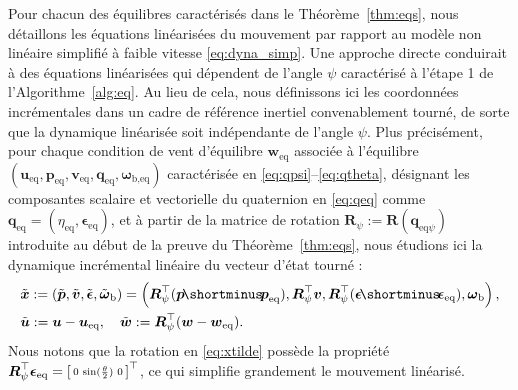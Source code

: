 Pour chacun des équilibres caractérisés dans le Théorème~\ref{thm:eqs}, nous détaillons les équations linéarisées du mouvement par rapport au modèle non linéaire simplifié à faible vitesse \eqref{eq:dyna_simp}. Une approche directe conduirait à des équations linéarisées qui dépendent de l'angle $\psi$ caractérisé à l'étape 1 de l'Algorithme~\ref{alg:eq}. Au lieu de cela, nous définissons ici les coordonnées incrémentales dans un cadre de référence inertiel convenablement tourné, de sorte que la dynamique linéarisée soit indépendante de l'angle $\psi$.
Plus précisément, pour chaque condition de vent d'équilibre $\boldsymbol{w}_{\text{eq}}$ associée à l'équilibre $(\boldsymbol{u}_{\text{eq}}, \boldsymbol{p}_{\text{eq}},\boldsymbol{v}_{\text{eq}}, \boldsymbol{q}_{\text{eq}},\boldsymbol{\omega}_{\text{b},\text{eq}})$  caractérisée en \eqref{eq:qpsi}--\eqref{eq:qtheta}, 
désignant les composantes scalaire et vectorielle du quaternion en \eqref{eq:qeq} comme
$\boldsymbol{q}_{\text{eq}} = (\eta_{\text{eq}}, \boldsymbol{\epsilon}_{\text{eq}})$, et à partir de la matrice de rotation
$\boldsymbol{R}_{\psi} :=    \boldsymbol{R}(\boldsymbol{q}_{\mathrm{eq}\psi})$ introduite au début de la preuve du Théorème~\ref{thm:eqs}, nous étudions ici la dynamique incrémental linéaire du vecteur d'état tourné :  
\begin{align}
\label{eq:xtilde}
     \nonumber &\tilde{\boldsymbol{x}} := (\tilde{\boldsymbol{p}},
     \tilde{\boldsymbol{v}},
     \tilde{\boldsymbol{\epsilon}},
     \tilde{\boldsymbol{\omega}}_{\text{b}}) = \left(\boldsymbol{R}^\top_{\psi} (\boldsymbol{p} \! \shortminus \! \boldsymbol{p}_{\text{eq}}), \boldsymbol{R}^\top_{\psi} \boldsymbol{v}, \boldsymbol{R}^\top_{\psi} (\boldsymbol{\epsilon} \! \shortminus \! \boldsymbol{\epsilon}_{\text{eq}}), \boldsymbol{\omega}_{\text{b}} \right), \\ &\tilde{\boldsymbol{u}} := \boldsymbol{u}-\boldsymbol{u_{\text{eq}}}, \quad \tilde{\boldsymbol{w}} := \boldsymbol{R}^\top_{\psi} (\boldsymbol{w}-\boldsymbol{w}_{\mathrm{eq}}).
\end{align}
Nous notons que la rotation en \eqref{eq:xtilde} possède la propriété $\boldsymbol{R}^\top_{\psi} \boldsymbol{\epsilon}_{\text{eq}} = \left[ \begin{smallmatrix}0 & \sin(\frac{\theta}{2}) & 0 \end{smallmatrix} \right]^\top$, ce qui simplifie grandement le mouvement linéarisé.

